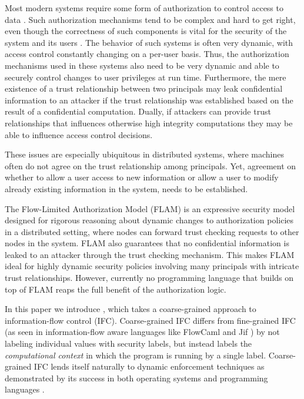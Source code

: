 Most modern systems require some form of authorization to control access to data \cite{Menezes:1996:HAC:548089}. Such authorization mechanisms tend to be complex and hard to get right, even though the correctness of such components is vital for the security of the system and its users \cite{Ferraiolo:1999:RAC:300830.300834}. 
The behavior of such systems is often very dynamic, with access control constantly changing on a per-user basis. Thus, the authorization mechanisms used in these systems also need to be very dynamic and able to securely control changes to user privileges \cite{Ferraiolo:1999:RAC:300830.300834} at run time. Furthermore, the mere existence of a trust relationship between two principals may leak confidential information to an attacker if the trust relationship was established based on the result of a confidential computation. Dually, if attackers can provide trust relationships that influences otherwise high integrity computations they may be able to influence access control decisions.

These issues are especially ubiquitous in distributed systems, where machines often do not agree on the trust relationship among principals. Yet, agreement on whether to allow a user access to new information or allow a user to modify already existing information in the system, needs to be established.

The Flow-Limited Authorization Model (FLAM) \cite{Arden:2015:FA:2859845.2859998} is an expressive security model designed for rigorous reasoning about dynamic changes to authorization policies in a distributed setting, where nodes can forward trust checking requests to other nodes in the system. FLAM also guarantees that no confidential information is leaked to an attacker through the trust checking mechanism. This makes FLAM ideal for highly dynamic security policies involving many principals with intricate trust relationships. However, currently no programming language that builds on top of FLAM reaps the full benefit of the authorization logic.

In this paper we introduce \lang{}, which takes a coarse-grained approach to information-flow control (IFC). Coarse-grained IFC differs from fine-grained IFC (as seen in information-flow aware languages like FlowCaml \cite{Pottier:2003:IFI:596980.596983} and Jif \cite{Myers:1999:JPM:292540.292561}) by not labeling individual values with security labels, but instead labels the \emph{computational context} in which the program is running by a single label. Coarse-grained IFC lends itself naturally to dynamic enforcement techniques as demonstrated by its success in both operating systems \cite{Zeldovich:2006:MIF:1267308.1267327, Zeldovich:2008:SDS:1387589.1387610, Efstathopoulos:2005:LEP:1095810.1095813, Krohn:2007:IFC:1294261.1294293} and programming languages \cite{SRMMlio, Buiras:2015:HMS:2784731.2784758, Stefan:2012:ACT:2364527.2364557, Buiras:2015:DED:2786558.2786563}.

